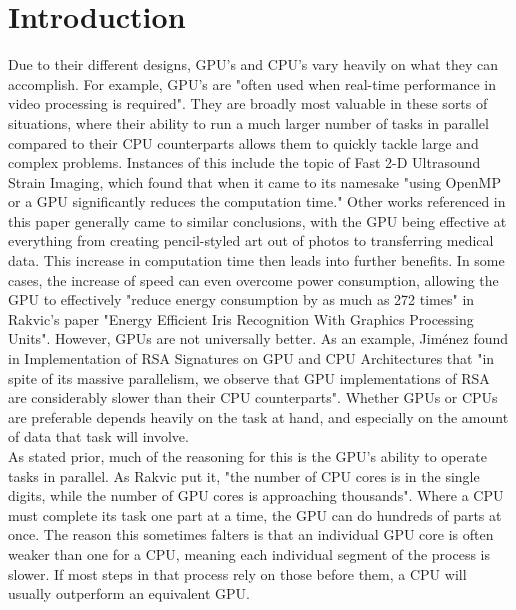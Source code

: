 \documentclass[conference]{IEEEtran}
\begin{document}
\section{Introduction}
Due to their different designs, GPU's and CPU's vary heavily on what they can accomplish. For example, GPU's are "often used when real-time performance in video processing is required"\cite{Blair}. They are broadly most valuable in these sorts of situations, where their ability to run a much larger number of tasks in parallel compared to their CPU counterparts allows them to quickly tackle large and complex problems. Instances of this include the topic of Fast 2-D Ultrasound Strain Imaging, which found that when it came to its namesake "using OpenMP or a GPU significantly reduces the computation time."\cite{Idzenga} Other works referenced in this paper generally came to similar conclusions, with the GPU being effective at everything from creating pencil-styled art out of photos to transferring medical data. This increase in computation time then leads into further benefits. In some cases, the increase of speed can even overcome power consumption, allowing the GPU to effectively "reduce energy consumption by as much
as 272 times" in Rakvic's paper "Energy Efficient Iris Recognition With Graphics Processing Units"\cite{Rakvic}. However, GPUs are not universally better. As an example, Jiménez found in Implementation of RSA Signatures on GPU and CPU Architectures that "in spite of its massive parallelism, we observe that GPU implementations of RSA are considerably slower than their CPU counterparts"\cite{Jimenez}. Whether GPUs or CPUs are preferable depends heavily on the task at hand, and especially on the amount of data that task will involve.\\
As stated prior, much of the reasoning for this is the GPU's ability to operate tasks in parallel. As Rakvic put it, "the number of CPU cores is in the single digits, while the number of GPU cores is approaching thousands"\cite{Rakvic}. Where a CPU must complete its task one part at a time, the GPU can do hundreds of parts at once. The reason this sometimes falters is that an individual GPU core is often weaker than one for a CPU, meaning each individual segment of the process is slower. If most steps in that process rely on those before them, a CPU will usually outperform an equivalent GPU.\\
\end{document}
